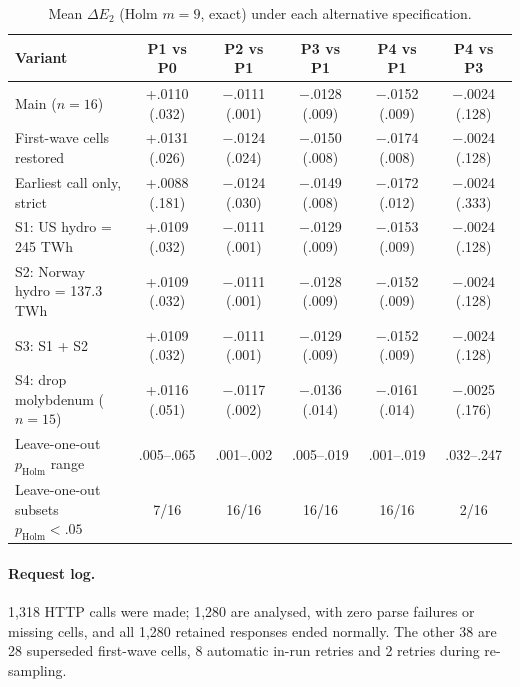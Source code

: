 \documentclass[10pt]{article}
\newenvironment{fittable}{\begin{lrbox}{\manuscripttable}}{%
\end{lrbox}\ifdim\wd\manuscripttable>\linewidth
\resizebox{\linewidth}{!}{\usebox{\manuscripttable}}%
\else\usebox{\manuscripttable}\fi}
\theoremstyle{manuscript}\newtheorem{proposition}{Proposition}
\newcommand{\pH}{p_{\text{Holm}}}
\begin{document}
\begin{table}[ht]\centering\small
\caption{Mean $\Delta E_2$ (Holm $m=9$, exact) under each alternative specification.}\label{tab:robust}
\setlength{\tabcolsep}{3.2pt}\small
\begin{fittable}
\begin{tabular}{@{}lccccc@{}}\toprule
Variant & P1 vs P0 & P2 vs P1 & P3 vs P1 & P4 vs P1 & P4 vs P3\\\midrule
Main ($n=16$) & +.0110 (.032) & $-$.0111 (.001) & $-$.0128 (.009) & $-$.0152 (.009) & $-$.0024 (.128)\\
First-wave cells restored & +.0131 (.026) & $-$.0124 (.024) & $-$.0150 (.008) & $-$.0174 (.008) & $-$.0024 (.128)\\
Earliest call only, strict & +.0088 (.181) & $-$.0124 (.030) & $-$.0149 (.008) & $-$.0172 (.012) & $-$.0024 (.333)\\
S1: US hydro = 245 TWh & +.0109 (.032) & $-$.0111 (.001) & $-$.0129 (.009) & $-$.0153 (.009) & $-$.0024 (.128)\\
S2: Norway hydro = 137.3 TWh & +.0109 (.032) & $-$.0111 (.001) & $-$.0128 (.009) & $-$.0152 (.009) & $-$.0024 (.128)\\
S3: S1 + S2 & +.0109 (.032) & $-$.0111 (.001) & $-$.0129 (.009) & $-$.0152 (.009) & $-$.0024 (.128)\\
S4: drop molybdenum ($n=15$) & +.0116 (.051) & $-$.0117 (.002) & $-$.0136 (.014) & $-$.0161 (.014) & $-$.0025 (.176)\\
Leave-one-out $\pH$ range & .005--.065 & .001--.002 & .005--.019 & .001--.019 & .032--.247\\
Leave-one-out subsets $\pH<.05$ & 7/16 & 16/16 & 16/16 & 16/16 & 2/16\\\bottomrule
\end{tabular}
\end{fittable}
\end{table}

\paragraph{Request log.} 1,318 HTTP calls were made; 1,280 are analysed, with zero parse failures or missing cells, and all 1,280 retained responses ended normally. The other 38 are 28 superseded first-wave cells, 8 automatic in-run retries and 2 retries during re-sampling.
\end{document}
